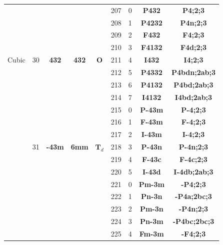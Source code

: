 \documentclass{article}      %
\begin{document}
\begin{small}
\begin{longtable}[c]{|c|c|c|c|c|c|c|c|c|}
 & & & & &\textrm{207} &0 &\textbf{P432} &\textbf{P4;2;3} \\\cline{6-9}
 & & & & &\textrm{208} &1 &\textbf{P4232} &\textbf{P4n;2;3} \\\cline{6-9}
 & & & & &\textrm{209} &2 &\textbf{F432} &\textbf{F4;2;3} \\\cline{6-9}
 & & & & &\textrm{210} &3 &\textbf{F4132} &\textbf{F4d;2;3} \\\cline{6-9}
 \textrm{Cubic} & \textrm{30} &\textbf{432} &\textbf{432} &$\mathbf{O}$ &\textrm{211} &4 &\textbf{I432}&\textbf{I4;2;3} \\\cline{6-9}
 & & & & &\textrm{212} &5 &\textbf{P4332} &\textbf{P4bdn;2ab;3} \\\cline{6-9}
 & & & & &\textrm{213} &6 &\textbf{P4132} &\textbf{P4bd;2ab;3} \\\cline{6-9}
 & & & & &\textrm{214} &7 &\textbf{I4132} &\textbf{I4bd;2ab;3} \\\cline{2-9}
 & & & & &\textrm{215} &0 &\textbf{P-43m} &\textbf{P-4;2;3} \\\cline{6-9}
 & & & & &\textrm{216} &1 &\textbf{F-43m} &\textbf{F-4;2;3} \\\cline{6-9}
 & & & & &\textrm{217} &2 &\textbf{I-43m} &\textbf{I-4;2;3} \\\cline{6-9}
 & \textrm{31} &\textbf{-43m} &\textbf{6mm} &$\mathbf{T}_{d}$ &\textrm{218} &3 &\textbf{P-43n}&\textbf{P-4n;2;3} \\\cline{6-9}
 & & & & &\textrm{219} &4 &\textbf{F-43c}&\textbf{F-4c;2;3} \\\cline{6-9}
 & & & & &\textrm{220} &5 &\textbf{I-43d}&\textbf{I-4db;2ab;3} \\\cline{2-9}
 & & & & &\textrm{221} & 0&\textbf{Pm-3m}&\textbf{-P4;2;3} \\\cline{6-9}
 & & & & &\textrm{222} & 1&\textbf{Pn-3n}&\textbf{-P4a;2bc;3} \\\cline{6-9}
 & & & & &\textrm{223} & 2&\textbf{Pm-3n}&\textbf{-P4n;2;3} \\\cline{6-9}
 & & & & &\textrm{224} & 3&\textbf{Pn-3m}&\textbf{-P4bc;2bc;3} \\\cline{6-9}
 & & & & &\textrm{225} & 4&\textbf{Fm-3m}&\textbf{-F4;2;3} \\\cline{6-9}

\end{longtable}
\end{small}
\end{document}
